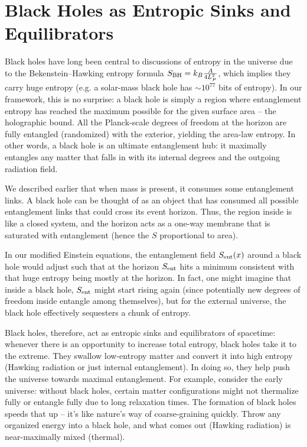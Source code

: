\documentclass[11pt]{article}
\begin{document}
\section{Black Holes as Entropic Sinks and Equilibrators}

Black holes have long been central to discussions of entropy in the universe due to the Bekenstein–Hawking entropy formula 
$S_{\rm BH} = k_B \frac{A}{4L_P^2}$, 
which implies they carry huge entropy (e.g. a solar-mass black hole has $\sim 10^{77}$ bits of entropy)​. In our framework, this is no surprise: a black hole is simply a region where entanglement entropy has reached the maximum possible for the given surface area – the holographic bound. All the Planck-scale degrees of freedom at the horizon are fully entangled (randomized) with the exterior, yielding the area-law entropy​. In other words, a black hole is an ultimate entanglement hub: it maximally entangles any matter that falls in with its internal degrees and the outgoing radiation field.

We described earlier that when mass is present, it consumes some entanglement links. A black hole can be thought of as an object that has consumed all possible entanglement links that could cross its event horizon. Thus, the region inside is like a closed system, and the horizon acts as a one-way membrane that is saturated with entanglement (hence the $S$ proportional to area).

In our modified Einstein equations, the entanglement field $S_{\rm ent}(x)$ around a black hole would adjust such that at the horizon $S_{\rm ent}$ hits a minimum consistent with that huge entropy being mostly at the horizon. In fact, one might imagine that inside a black hole, $S_{\rm ent}$ might start rising again (since potentially new degrees of freedom inside entangle among themselves), but for the external universe, the black hole effectively sequesters a chunk of entropy.

Black holes, therefore, act as entropic sinks and equilibrators of spacetime: whenever there is an opportunity to increase total entropy, black holes take it to the extreme. They swallow low-entropy matter and convert it into high entropy (Hawking radiation or just internal entanglement). In doing so, they help push the universe towards maximal entanglement. For example, consider the early universe: without black holes, certain matter configurations might not thermalize fully or entangle fully due to long relaxation times. The formation of black holes speeds that up – it's like nature’s way of coarse-graining quickly. Throw any organized energy into a black hole, and what comes out (Hawking radiation) is near-maximally mixed (thermal).
\end{document}

